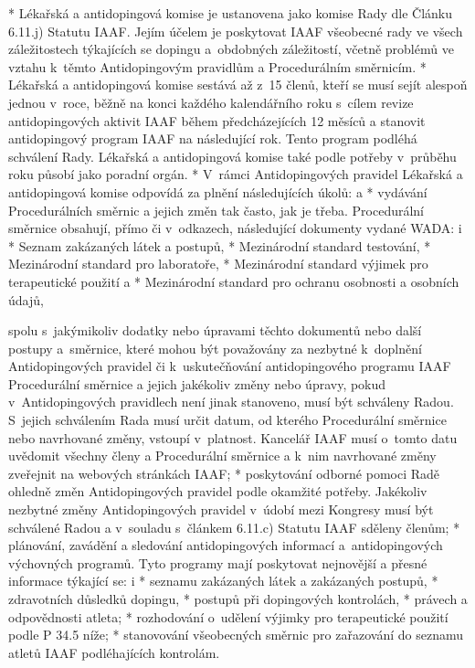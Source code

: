 * Lékařská a antidopingová komise je ustanovena jako komise Rady dle Článku 6.11.j) Statutu IAAF. Jejím účelem je poskytovat IAAF všeobecné rady ve všech záležitostech týkajících se dopingu a~obdobných záležitostí, včetně problémů ve vztahu k~těmto Antidopingovým pravidlům a  Procedurálním směrnicím.
* Lékařská a antidopingová komise sestává až z~15 členů, kteří se musí sejít alespoň jednou v~roce, běžně na konci každého kalendářního roku s~cílem revize antidopingových aktivit IAAF během předcházejících 12 měsíců a stanovit antidopingový program IAAF na následující rok. Tento program podléhá schválení Rady. Lékařská a antidopingová komise také podle potřeby v~průběhu roku působí jako poradní orgán.
* V~rámci Antidopingových pravidel Lékařská a antidopingová komise odpovídá za plnění následujících úkolů:
  \begitems \style a
  * vydávání Procedurálních směrnic a jejich změn tak často, jak je třeba. Procedurální směrnice obsahují, přímo či v~odkazech, následující dokumenty vydané WADA:
    \begitems \style i
    * Seznam zakázaných látek a postupů,
    * Mezinárodní standard testování,
    * Mezinárodní standard pro laboratoře,
    * Mezinárodní standard výjimek pro terapeutické použití a
    * Mezinárodní standard pro ochranu osobnosti a osobních údajů,

    spolu s~jakýmikoliv dodatky nebo úpravami  těchto dokumentů nebo další postupy a~směrnice, které mohou být považovány za nezbytné k~doplnění Antidopingových pravidel či k~uskutečňování antidopingového programu IAAF
    Procedurální směrnice a jejich jakékoliv změny nebo úpravy, pokud v~Antidopingových pravidlech není jinak stanoveno, musí být schváleny Radou. S~jejich schválením Rada musí určit datum, od kterého Procedurální směrnice nebo navrhované změny, vstoupí v~platnost. Kancelář IAAF musí o~tomto datu uvědomit všechny členy a Procedurální směrnice a k~nim navrhované změny zveřejnit na webových stránkách IAAF;
    \enditems
  * poskytování odborné pomoci Radě ohledně změn Antidopingových pravidel podle okamžité potřeby. Jakékoliv nezbytné změny Antidopingových pravidel v~údobí mezi Kongresy musí být schválené Radou a v~souladu s~článkem 6.11.c) Statutu IAAF sděleny členům;
  * plánování, zavádění a sledování antidopingových informací a~antidopingových výchovných programů. Tyto programy mají poskytovat nejnovější a přesné informace týkající se:
    \begitems \style i
    * seznamu zakázaných látek a zakázaných postupů,
    * zdravotních důsledků dopingu,
    * postupů při dopingových kontrolách,
    * právech a odpovědnosti atleta;
    \enditems
  * rozhodování o~udělení výjimky pro terapeutické použití podle P 34.5 níže;
  * stanovování všeobecných směrnic pro zařazování do seznamu atletů IAAF podléhajících kontrolám.
  \enditems

